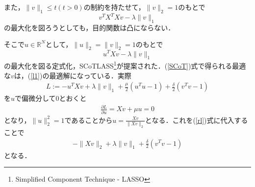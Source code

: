 \documentclass{jsarticle}
\theoremstyle{definition}
\theoremstyle{mystyle} %
\begin{document}
また，$\|v\|_1\leq t(t>0)$の制約を持たせて，$\|v\|_2=1$のもとで
\begin{equation}
\label{l1}
v^TX^TXv-\lambda \|v\|_1
\end{equation}
の最大化を図ろうとしても，目的関数は凸にならない．\\
\vspace{5cm}

そこで$u\in\mathbb{R}^N$として，$\|u\|_2=\|v\|_2=1$のもとで
\begin{equation}
\label{SCoT}
u^TXv-\lambda\|v\|_1
\end{equation}の最大化を図る定式化，SCoTLASS\footnote{Simplified Component Technique - LASSO}が提案された．(\ref{SCoT})式で得られる最適な$v$は，(\ref{l1})の最適解になっている．実際
\begin{align}
\label{rl}
L:=-u^TXv+\lambda\|v\|_1+\frac{\mu}{2}(u^Tu-1)+\frac{\delta}{2}(v^Tv-1)
\end{align}
を$u$で偏微分して$0$とおくと
\begin{align*}
\frac{\partial L}{\partial u}=X v+\mu u=0
\end{align*}
となり，$\|u\|_2^2=1$であることから$\displaystyle u = \frac{Xv}{\|Xv\|_2}$となる．これを(\ref{rl})式に代入することで
\begin{align}
-\|Xv\|_2+\lambda\|v\|_1+\frac{\delta}{2}(v^Tv-1)
\end{align}
となる．
\end{document}
